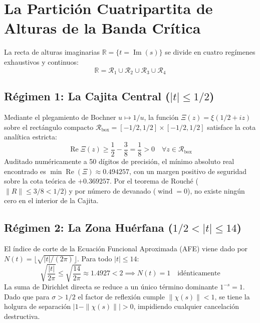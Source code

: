 \documentclass[11pt,a4paper]{article}
\theoremstyle{plain}
\theoremstyle{definition}
\begin{document}
\section{La Partición Cuatripartita de Alturas de la Banda Crítica}

La recta de alturas imaginarias $\mathbb{R} = \{t = \operatorname{Im}(s)\}$ se divide en cuatro regímenes exhaustivos y continuos:
$$\mathbb{R} = \mathcal{R}_1 \cup \mathcal{R}_2 \cup \mathcal{R}_3 \cup \mathcal{R}_4$$

\subsection{Régimen 1: La Cajita Central ($|t| \le 1/2$)}
Mediante el plegamiento de Bochner $u \mapsto 1/u$, la función $\Xi(z) = \xi(1/2 + iz)$ sobre el rectángulo compacto $\mathcal{R}_{\text{box}} = [-1/2, 1/2] \times [-1/2, 1/2]$ satisface la cota analítica estricta:
$$\operatorname{Re} \Xi(z) \ge \frac{1}{2} - \frac{3}{8} = \frac{1}{8} > 0 \quad \forall z \in \mathcal{R}_{\text{box}}$$
Auditado numéricamente a 50 dígitos de precisión, el mínimo absoluto real encontrado es $\min \operatorname{Re}(\Xi) \approx 0.494257$, con un margen positivo de seguridad sobre la cota teórica de $+0.369257$. Por el teorema de Rouché ($\|R\| \le 3/8 < 1/2$) y por número de devanado ($\operatorname{wind} = 0$), no existe ningún cero en el interior de la Cajita.

\subsection{Régimen 2: La Zona Huérfana ($1/2 < |t| \le 14$)}
El índice de corte de la Ecuación Funcional Aproximada (AFE) viene dado por $N(t) = \lfloor \sqrt{|t|/(2\pi)} \rfloor$.
Para todo $|t| \le 14$:
$$\sqrt{\frac{|t|}{2\pi}} \le \sqrt{\frac{14}{2\pi}} \approx 1.4927 < 2 \implies N(t) = 1 \quad \text{idénticamente}$$
La suma de Dirichlet directa se reduce a un único término dominante $1^{-s} = 1$. Dado que para $\sigma > 1/2$ el factor de reflexión cumple $\|\chi(s)\| < 1$, se tiene la holgura de separación $|1 - \|\chi(s)\|| > 0$, impidiendo cualquier cancelación destructiva.
\end{document}

